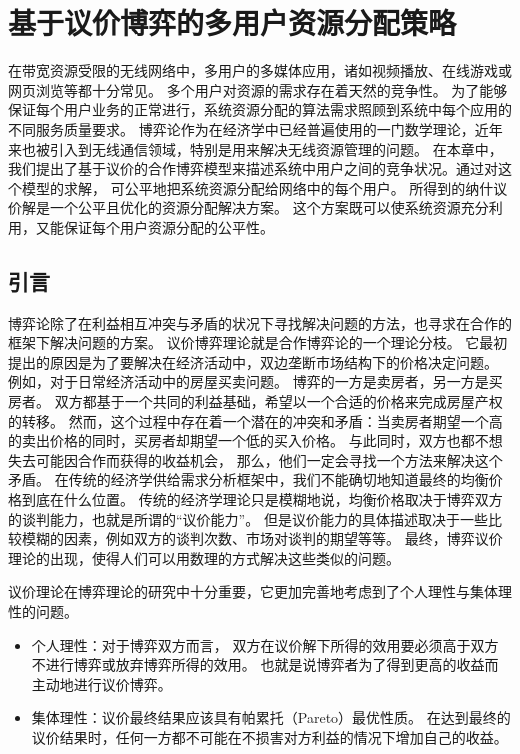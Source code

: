 \graphicspath{ {../body/nash_bargaining_figures/} }
\chapter{基于议价博弈的多用户资源分配策略}
在带宽资源受限的无线网络中，多用户的多媒体应用，诸如视频播放、在线游戏或网页浏览等都十分常见。
多个用户对资源的需求存在着天然的竞争性。
为了能够保证每个用户业务的正常进行，系统资源分配的算法需求照顾到系统中每个应用的不同服务质量要求。
博弈论作为在经济学中已经普遍使用的一门数学理论，近年来也被引入到无线通信领域，特别是用来解决无线资源管理的问题。
在本章中，我们提出了基于议价的合作博弈模型来描述系统中用户之间的竞争状况。通过对这个模型的求解，
可公平地把系统资源分配给网络中的每个用户。
所得到的纳什议价解是一个公平且优化的资源分配解决方案。
这个方案既可以使系统资源充分利用，又能保证每个用户资源分配的公平性。

\section{引言}
博弈论除了在利益相互冲突与矛盾的状况下寻找解决问题的方法，也寻求在合作的框架下解决问题的方案。
议价博弈理论就是合作博弈论的一个理论分枝。
它最初提出的原因是为了要解决在经济活动中，双边垄断市场结构下的价格决定问题。
例如，对于日常经济活动中的房屋买卖问题。
博弈的一方是卖房者，另一方是买房者。
双方都基于一个共同的利益基础，希望以一个合适的价格来完成房屋产权的转移。
然而，这个过程中存在着一个潜在的冲突和矛盾：当卖房者期望一个高的卖出价格的同时，买房者却期望一个低的买入价格。
与此同时，双方也都不想失去可能因合作而获得的收益机会，
那么，他们一定会寻找一个方法来解决这个矛盾。
在传统的经济学供给需求分析框架中，我们不能确切地知道最终的均衡价格到底在什么位置。
传统的经济学理论只是模糊地说，均衡价格取决于博弈双方的谈判能力，也就是所谓的“议价能力”。
但是议价能力的具体描述取决于一些比较模糊的因素，例如双方的谈判次数、市场对谈判的期望等等。
最终，博弈议价理论的出现，使得人们可以用数理的方式解决这些类似的问题。

议价理论在博弈理论的研究中十分重要，它更加完善地考虑到了个人理性与集体理性的问题。

\begin{itemize}
\item 个人理性：对于博弈双方而言，
双方在议价解下所得的效用要必须高于双方不进行博弈或放弃博弈所得的效用。
也就是说博弈者为了得到更高的收益而主动地进行议价博弈。
\item 集体理性：议价最终结果应该具有帕累托（Pareto）最优性质。
在达到最终的议价结果时，任何一方都不可能在不损害对方利益的情况下增加自己的收益。
\end{itemize}


